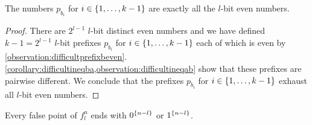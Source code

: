\begin{observation}
\label{observation:difficultpreifxbevenequiv}
The numbers $p_{b_i}$ for $i \in \{1, \ldots, k-1\}$
are exactly
all the $l$-bit even numbers.
\end{observation}

\begin{proof}
There are $2^{l-1}$ $l$-bit
distinct even numbers
and we have defined $k-1 = 2^{l-1}$
$l$-bit
prefixes $p_{b_i}$ for $i \in \{1, \ldots, k-1\}$
each of which is even
by \cref{observation:difficultprefixbeven}.
\cref{corollary:difficultineqba,observation:difficultineqab}
show that these prefixes are pairwise different.
We conclude that the prefixes
$p_{b_i}$ for $i \in \{1, \ldots, k-1\}$
exhaust all $l$-bit even numbers.
\end{proof}

\begin{observation}
\label{observation:difficultfpsuffix}
Every false point of $f_l^n$ ends with $0^{\{n-l\}}$
or $1^{\{n-l\}}$.
\end{observation}

